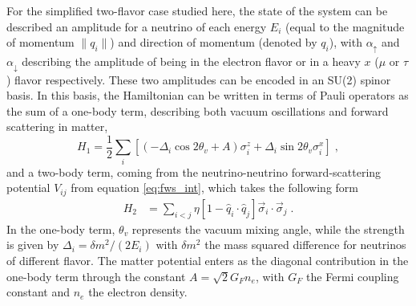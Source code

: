 \documentclass[10pt]{article}
\begin{document}
For the simplified two-flavor case studied here, the state of the system can be described an amplitude for a neutrino of each energy $E_i$ (equal to the magnitude of momentum $\|{q}_i\|$) and direction of momentum (denoted by $q_i$), with $\alpha_\uparrow$ and $\alpha_\downarrow$ describing the amplitude of being in the electron flavor or in a heavy $x$ ($\mu$ or $\tau$) flavor respectively. These two amplitudes can be encoded in an SU(2) spinor
basis. In this basis, the Hamiltonian can be written in terms of Pauli operators as the sum of a one-body term, describing both vacuum oscillations and forward scattering in matter, 
\begin{equation}
\label{eq:Ham_init}
H_1  = \frac{1}{2} \sum_i \left[ \left(-\Delta_i\cos{2 \theta_v} + A\right)\sigma^z_i + \Delta_i\sin {2 \theta_v} \sigma^x_i \right]\;,
\end{equation}
and a two-body term, coming from the neutrino-neutrino forward-scattering potential $V_{ij}$ from equation \eqref{eq:fws_int}, which takes the following form~\cite{Pehlivan2011}
\begin{equation}
\begin{split}
H_2 & =  \sum_{i<j} \eta  [1- \hat{q}_i \cdot \hat{q}_j ] \vec{\sigma}_i \cdot \vec{\sigma}_j\;.
\end{split}
\end{equation}
In the one-body term, $\theta_v$ represents the vacuum mixing angle, while the strength is given by $\Delta_i = \delta m^2/(2 E_i)$ with $\delta m^2$ the mass squared difference for neutrinos of different flavor. The matter potential enters as the diagonal contribution in the one-body term through the constant $A = \sqrt{2} G_F n_e$, with $G_F$ the Fermi coupling constant and $n_e$ the electron density.
\end{document}
